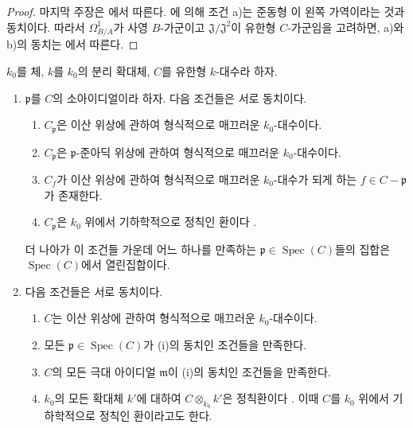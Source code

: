 \begin{proof}
마지막 주장은 에서 따른다.
에 의해 조건 a)는 준동형
이 왼쪽 가역이라는 것과 동치이다. 따라서
$\Omega^1_{B/A}$가 사영 $B$-가군이고
$\mathfrak J/\mathfrak J^2$이 유한형 $C$-가군임을 고려하면,
a)와 b)의 동치는 에서 따른다.
\end{proof}

\begin{proposition}[22.6.7]
\label{0.22.6.7-ko}
$k_0$를 체, $k$를 $k_0$의 분리 확대체, $C$를 유한형 $k$-대수라
하자.
\begin{enumerate}
  \item[\rm(i)] $\mathfrak p$를 $C$의 소아이디얼이라 하자. 다음
  조건들은 서로 동치이다.
  \begin{enumerate}
    \item[a)] $C_{\mathfrak p}$은 이산 위상에 관하여 형식적으로
    매끄러운 $k_0$-대수이다.
    \item[b)] $C_{\mathfrak p}$은 $\mathfrak p$-준아딕 위상에
    관하여 형식적으로 매끄러운 $k_0$-대수이다.
    \item[c)] $C_f$가 이산 위상에 관하여 형식적으로 매끄러운
    $k_0$-대수가 되게 하는 $f\in C-\mathfrak p$가 존재한다.
    \item[d)] $C_{\mathfrak p}$은 $k_0$ 위에서 기하학적으로 정칙인
    환이다 .
  \end{enumerate}
  더 나아가 이 조건들 가운데 어느 하나를 만족하는
  $\mathfrak p\in\operatorname{Spec}(C)$들의 집합은
  $\operatorname{Spec}(C)$에서 열린집합이다.
  \item[\rm(ii)] 다음 조건들은 서로 동치이다.
  \begin{enumerate}
    \item[a)] $C$는 이산 위상에 관하여 형식적으로 매끄러운
    $k_0$-대수이다.
    \item[b)] 모든 $\mathfrak p\in\operatorname{Spec}(C)$가
    (i)의 동치인 조건들을 만족한다.
    \item[c)] $C$의 모든 극대 아이디얼 $\mathfrak m$이 (i)의
    동치인 조건들을 만족한다.
    \item[d)] $k_0$의 모든 확대체 $k'$에 대하여
    $C\otimes_{k_0}k'$은 정칙환이다 . 이때 $C$를
    $k_0$ 위에서 기하학적으로 정칙인 환이라고도 한다.
  \end{enumerate}



\end{enumerate}
\end{proposition}
